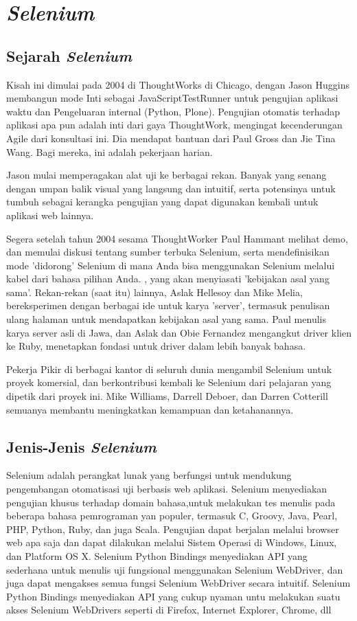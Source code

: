 \chapter{\textit{Selenium}}

\section{Sejarah \textit{Selenium}}
Kisah ini dimulai pada 2004 di ThoughtWorks di Chicago, dengan Jason Huggins membangun mode Inti sebagai JavaScriptTestRunner untuk pengujian aplikasi waktu dan Pengeluaran internal (Python, Plone). Pengujian otomatis terhadap aplikasi apa pun adalah inti dari gaya ThoughtWork, mengingat kecenderungan Agile dari konsultasi ini. Dia mendapat bantuan dari Paul Gross dan Jie Tina Wang. Bagi mereka, ini adalah pekerjaan harian.

Jason mulai memperagakan alat uji ke berbagai rekan. Banyak yang senang dengan umpan balik visual yang langsung dan intuitif, serta potensinya untuk tumbuh sebagai kerangka pengujian yang dapat digunakan kembali untuk aplikasi web lainnya.

Segera setelah tahun 2004 sesama ThoughtWorker Paul Hammant melihat demo, dan memulai diskusi tentang sumber terbuka Selenium, serta mendefinisikan mode 'didorong' Selenium di mana Anda bisa menggunakan Selenium melalui kabel dari bahasa pilihan Anda. , yang akan menyiasati 'kebijakan asal yang sama'. Rekan-rekan (saat itu) lainnya, Aslak Hellesoy dan Mike Melia, bereksperimen dengan berbagai ide untuk karya 'server', termasuk penulisan ulang halaman untuk mendapatkan kebijakan asal yang sama. Paul menulis karya server asli di Jawa, dan Aslak dan Obie Fernandez mengangkut driver klien ke Ruby, menetapkan fondasi untuk driver dalam lebih banyak bahasa.

Pekerja Pikir di berbagai kantor di seluruh dunia mengambil Selenium untuk proyek komersial, dan berkontribusi kembali ke Selenium dari pelajaran yang dipetik dari proyek ini. Mike Williams, Darrell Deboer, dan Darren Cotterill semuanya membantu meningkatkan kemampuan dan ketahanannya.

\section{Jenis-Jenis \textit{Selenium} \textit{}}
Selenium adalah perangkat lunak yang berfungsi untuk mendukung pengembangan otomatisasi uji berbasis web aplikasi. Selenium menyediakan pengujian khusus terhadap domain bahasa,untuk melakukan tes menulis pada beberapa bahasa pemrograman yan populer, termasuk C, Groovy, Java, Pearl, PHP, Python, Ruby, dan juga Scala. Pengujian dapat berjalan melalui browser web apa saja dan dapat dilakukan melalui Sistem Operasi di Windows, Linux, dan Platform OS X. Selenium Python Bindings menyediakan API yang sederhana untuk menulis uji fungsional menggunakan Selenium WebDriver, dan juga dapat mengakses semua fungsi Selenium WebDriver secara intuitif. Selenium Python Bindings menyediakan API yang cukup nyaman untu melakukan suatu akses Selenium WebDrivers seperti di Firefox, Internet Explorer, Chrome, dll 

